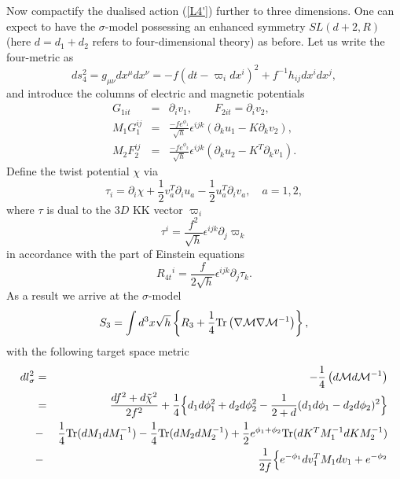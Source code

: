 \documentclass[a4paper,12pt]{article}
\def\Tr{{\rm Tr}}
\begin{document}
\begin{appendix}
Now compactify the dualised action (\ref{L4'}) further to three
dimensions. One can expect to have the $\sigma$-model possessing
an enhanced symmetry $SL(d+2,R)$ (here $d=d_1+d_2$ refers to
four-dimensional theory) as before. Let us write the four-metric
as
\begin{equation}\label{161}
ds^2_{4} = g_{\mu\nu} dx^{\mu} dx^{\nu} = - f (dt-\varpi_i
dx^i)^2 + f^{-1} h_{ij} dx^i dx^j,
\end{equation}
and introduce the columns of electric and magnetic potentials
\begin{eqnarray}
G_{1it} &=& \partial_i v_1, \qquad F_{2it} = \partial_i v_2, \\
M_1 G_1^{ij} &=& \frac{-f e^{\phi_1}}{\sqrt{h}}
\epsilon^{ijk}( \partial_k u_1 - K \partial_k v_2), \\
M_2 F_2^{ij} &=& \frac{-f e^{\phi_2}}{\sqrt{h}} \epsilon^{ijk}(
\partial_k u_2 - K^T \partial_k v_1).
\end{eqnarray}
Define the twist potential $\chi$ via
\begin{equation}
\tau_i = \partial_i \chi + \frac12 v_a^T \partial_i u_a -
\frac12 u_a^T \partial_i v_a, \quad a = 1,2,
\end{equation}
where $\tau$ is
dual to the $3D$ KK vector $\varpi_i$
\begin{equation}\label{168}
\tau^i = \frac{f^2}{\sqrt{h}} \epsilon^{ijk} \partial_j \varpi_k
\end{equation}
in accordance with the part of Einstein equations
\begin{equation}
R_{4t}{}^i = \frac{f}{2\sqrt{h}} \epsilon^{ijk} \partial_j
\tau_k.
\end{equation}
As a result we arrive at the $\sigma$-model
\begin{equation}\label{171}
S_3 = \int d^3x \sqrt{h} \left\{ R_3 + \frac14
\Tr\left(\nabla{\cal M} \nabla{\cal M}^{-1} \right) \right\},
\end{equation}
with the following target space metric
\begin{eqnarray}\label{Target}
dl_{\sigma}^2 &=& -\frac14\left( d {\cal M} d {\cal M}^{-1}
\right) \\
&=& \frac{d f^2 + d\tilde \chi^2}{2 f^2} + \frac14 \Bigl\{ d_1 d
\phi_1^2 + d_2 d \phi_2^2 - \frac1{2+d}(d_1 d \phi_1 - d_2 d
\phi_2)^2 \Bigr\} \nonumber\\
&-& \frac14 \Tr(d M_1 d M_1^{-1}) - \frac14 \Tr(d M_2 d M_2^{-1})
+ \frac12 e^{\phi_1+\phi_2}\Tr(d K^TM_1^{-1} d K M_2^{-1})
\nonumber\\
&-& \frac1{2f} \Bigl\{ e^{-\phi_1} dv_1^T M_1 dv_1 + e^{-\phi_2}

\end{eqnarray}
\end{appendix}
\end{document}
